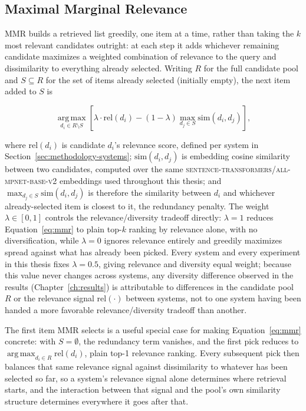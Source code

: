 \subsection{Maximal Marginal Relevance}
\label{sec:methodology-mmr}

MMR builds a retrieved list greedily, one item at a time, rather than taking the $k$ most relevant
candidates outright: at each step it adds whichever remaining candidate maximizes a weighted
combination of relevance to the query and dissimilarity to everything already selected. Writing
$R$ for the full candidate pool and $S \subseteq R$ for the set of items already selected
(initially empty), the next item added to $S$ is

\begin{equation}
\operatorname*{arg\,max}_{d_i \in R \setminus S}
\left[ \lambda \cdot \mathrm{rel}(d_i) - (1-\lambda) \max_{d_j \in S} \mathrm{sim}(d_i, d_j) \right],
\label{eq:mmr}
\end{equation}

\noindent where $\mathrm{rel}(d_i)$ is candidate $d_i$'s relevance score, defined per system in
Section~\ref{sec:methodology-systems}; $\mathrm{sim}(d_i, d_j)$ is embedding cosine similarity
between two candidates, computed over the same
\textsc{sentence-transformers/all-mpnet-base-v2} embeddings \cite{reimers2019sbert,song2020mpnet}
used throughout this thesis; and $\max_{d_j \in S} \mathrm{sim}(d_i, d_j)$ is therefore the
similarity between $d_i$ and whichever already-selected item is closest to it, the redundancy
penalty. The weight $\lambda \in [0,1]$ controls the relevance/diversity tradeoff directly:
$\lambda = 1$ reduces Equation~\ref{eq:mmr} to plain top-$k$ ranking by relevance alone, with no
diversification, while $\lambda = 0$ ignores relevance entirely and greedily maximizes spread
against what has already been picked. Every system and every experiment in this thesis fixes
$\lambda = 0.5$, giving relevance and diversity equal weight; because this value never changes
across systems, any diversity difference observed in the results (Chapter~\ref{ch:results}) is
attributable to differences in the candidate pool $R$ or the relevance signal $\mathrm{rel}(\cdot)$
between systems, not to one system having been handed a more favorable relevance/diversity
tradeoff than another.

The first item MMR selects is a useful special case for making Equation~\ref{eq:mmr} concrete: with
$S = \emptyset$, the redundancy term vanishes, and the first pick reduces to
$\operatorname*{arg\,max}_{d_i \in R} \mathrm{rel}(d_i)$, plain top-1 relevance ranking. Every
subsequent pick then balances that same relevance signal against dissimilarity to whatever has
been selected so far, so a system's relevance signal alone determines where retrieval starts, and
the interaction between that signal and the pool's own similarity structure determines everywhere
it goes after that.

